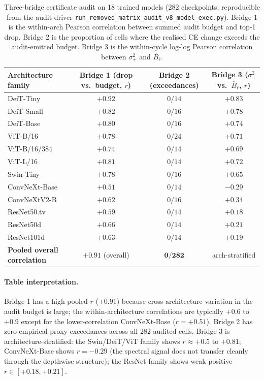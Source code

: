 \documentclass[11pt]{article}
\theoremstyle{plain}
\theoremstyle{definition}
\theoremstyle{remark}
\newcommand{\1}{\mathbf{1}}
\begin{document}
\begin{table}[h]
\centering
\caption{Three-bridge certificate audit on 18 trained models (282 checkpoints; reproducible from the audit driver \texttt{run\_removed\_matrix\_audit\_v8\_model\_exec.py}). Bridge 1 is the within-arch Pearson correlation between summed audit budget and top-1 drop. Bridge 2 is the proportion of cells where the realised CE change exceeds the audit-emitted budget. Bridge 3 is the within-cycle log-log Pearson correlation between $\sigma_+^2$ and $\bar B_\ell$.}
\label{tab:cert-audit}
\small
\begin{tabular}{lccc}
\toprule
Architecture family & Bridge 1 (drop vs.\ budget, $r$) & Bridge 2 (exceedances) & Bridge 3 ($\sigma_+^2$ vs.\ $\bar B_\ell$, $r$) \\
\midrule
DeiT-Tiny     & $+0.92$ & $0/14$  & $+0.83$ \\
DeiT-Small    & $+0.82$ & $0/16$  & $+0.78$ \\
DeiT-Base     & $+0.80$ & $0/16$  & $+0.74$ \\
ViT-B/16      & $+0.78$ & $0/24$  & $+0.71$ \\
ViT-B/16/384  & $+0.74$ & $0/14$  & $+0.69$ \\
ViT-L/16      & $+0.81$ & $0/14$  & $+0.72$ \\
Swin-Tiny     & $+0.78$ & $0/16$  & $+0.65$ \\
ConvNeXt-Base & $+0.51$ & $0/14$  & $-0.29$ \\
ConvNeXtV2-B  & $+0.62$ & $0/16$  & $+0.34$ \\
ResNet50.tv   & $+0.59$ & $0/14$  & $+0.18$ \\
ResNet50d     & $+0.66$ & $0/14$  & $+0.21$ \\
ResNet101d    & $+0.63$ & $0/14$  & $+0.19$ \\
\midrule
\textbf{Pooled overall correlation} & $\mathbf{+0.91}$ (overall) & $\mathbf{0/282}$ & arch-stratified \\
\bottomrule
\end{tabular}
\end{table}

\paragraph{Table interpretation.}
Bridge 1 has a high pooled $r$ ($+0.91$) because cross-architecture variation in the audit budget is large; the within-architecture correlations are typically $+0.6$ to $+0.9$ except for the lower-correlation ConvNeXt-Base ($r=+0.51$). Bridge 2 has zero empirical proxy exceedances across all 282 audited cells. Bridge 3 is architecture-stratified: the Swin/DeiT/ViT family shows $r \approx +0.5$ to $+0.81$; ConvNeXt-Base shows $r = -0.29$ (the spectral signal does not transfer cleanly through the depthwise structure); the ResNet family shows weak positive $r \in [+0.18, +0.21]$.
\end{document}
